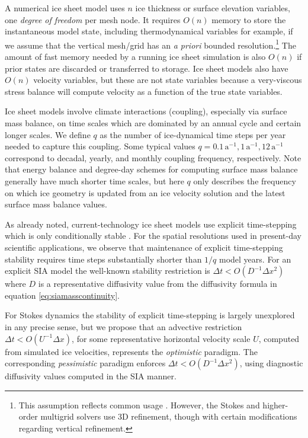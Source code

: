 \documentclass[twocolumn,letterpaper]{igs}
\begin{document}
A numerical ice sheet model uses $n$ ice thickness or surface elevation variables, one \emph{degree of freedom} per mesh node.  It requires $O(n)$ memory to store the instantaneous model state, including thermodynamical variables for example, if we assume that the vertical mesh/grid has an \emph{a priori} bounded resolution.\footnote{This assumption reflects common usage \citep[for example]{Aschwandenetal2019,Brinkerhoffetal2017,Hoffmanetal2018}.  However, the \cite{IsaacStadlerGhattas2015} Stokes and \cite{BrownSmithAhmadia2013} higher-order multigrid solvers use 3D refinement, though with certain modifications regarding vertical refinement.}  The amount of fast memory needed by a running ice sheet simulation is also $O(n)$ if prior states are discarded or transferred to storage.  Ice sheet models also have $O(n)$ velocity variables, but these are not state variables because a very-viscous stress balance will compute velocity as a function of the true state variables.
 
Ice sheet models involve climate interactions (coupling), especially via surface mass balance, on time scales which are dominated by an annual cycle and certain longer scales.  We define $q$ as the number of ice-dynamical time steps per year needed to capture this coupling.  Some typical values $q=0.1 \,\text{a}^{-1}, 1 \,\text{a}^{-1}, 12 \,\text{a}^{-1}$ correspond to decadal, yearly, and monthly coupling frequency, respectively.  Note that energy balance and degree-day schemes for computing surface mass balance generally have much shorter time scales, but here $q$ only describes the frequency on which ice geometry is updated from an ice velocity solution and the latest surface mass balance values.

As already noted, current-technology ice sheet models use explicit time-stepping which is only conditionally stable \citep{LeVeque2007}.  For the spatial resolutions used in present-day scientific applications, we observe that maintenance of explicit time-stepping stability requires time steps substantially shorter than $1/q$ model years.  For an explicit SIA model the well-known stability restriction is $\Delta t < O(D^{-1} \Delta x^2)$ \citep{Bueleretal2005,HindmarshPayne1996} where $D$ is a representative diffusivity value from the diffusivity formula in equation \eqref{eq:siamasscontinuity}.

For Stokes dynamics the stability of explicit time-stepping is largely unexplored in any precise sense, but we propose that an advective restriction $\Delta t < O(U^{-1} \Delta x)$, for some representative horizontal velocity scale $U$, computed from simulated ice velocities, represents the \emph{optimistic} paradigm.  The corresponding \emph{pessimistic} paradigm enforces $\Delta t < O(D^{-1} \Delta x^2)$, using diagnostic diffusivity values computed in the SIA manner.
\end{document}

